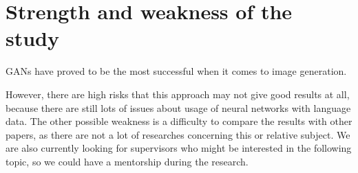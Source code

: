 \documentclass[sigplan]{acmart}
\begin{document}
\section{Strength and weakness of the study}
GANs have proved to be the most successful when it comes to image generation.

However, there are high risks that this approach may not give good results at all, because there are still lots of issues about  usage of neural networks with language data. The other possible weakness is a difficulty to compare the results with other papers, as there are not a lot of researches concerning this or relative subject. 
We are also currently looking for supervisors who might be interested in the following topic, so we could have a mentorship during the research.



\end{document}
